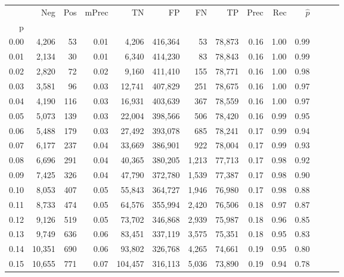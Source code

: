 \begin{tabular}{rrrrrrrrrrrrrr}
\toprule
{} &     Neg &    Pos & mPrec &       TN &       FP &      FN &      TP &  Prec &   Rec & $\hat{p}$ \\
p    &         &        &       &          &          &         &         &       &       &           \\
\midrule
0.00 &   4,206 &     53 &  0.01 &    4,206 &  416,364 &      53 &  78,873 &  0.16 &  1.00 &      0.99 \\
0.01 &   2,134 &     30 &  0.01 &    6,340 &  414,230 &      83 &  78,843 &  0.16 &  1.00 &      0.99 \\
0.02 &   2,820 &     72 &  0.02 &    9,160 &  411,410 &     155 &  78,771 &  0.16 &  1.00 &      0.98 \\
0.03 &   3,581 &     96 &  0.03 &   12,741 &  407,829 &     251 &  78,675 &  0.16 &  1.00 &      0.97 \\
0.04 &   4,190 &    116 &  0.03 &   16,931 &  403,639 &     367 &  78,559 &  0.16 &  1.00 &      0.97 \\
0.05 &   5,073 &    139 &  0.03 &   22,004 &  398,566 &     506 &  78,420 &  0.16 &  0.99 &      0.95 \\
0.06 &   5,488 &    179 &  0.03 &   27,492 &  393,078 &     685 &  78,241 &  0.17 &  0.99 &      0.94 \\
0.07 &   6,177 &    237 &  0.04 &   33,669 &  386,901 &     922 &  78,004 &  0.17 &  0.99 &      0.93 \\
0.08 &   6,696 &    291 &  0.04 &   40,365 &  380,205 &   1,213 &  77,713 &  0.17 &  0.98 &      0.92 \\
0.09 &   7,425 &    326 &  0.04 &   47,790 &  372,780 &   1,539 &  77,387 &  0.17 &  0.98 &      0.90 \\
0.10 &   8,053 &    407 &  0.05 &   55,843 &  364,727 &   1,946 &  76,980 &  0.17 &  0.98 &      0.88 \\
0.11 &   8,733 &    474 &  0.05 &   64,576 &  355,994 &   2,420 &  76,506 &  0.18 &  0.97 &      0.87 \\
0.12 &   9,126 &    519 &  0.05 &   73,702 &  346,868 &   2,939 &  75,987 &  0.18 &  0.96 &      0.85 \\
0.13 &   9,749 &    636 &  0.06 &   83,451 &  337,119 &   3,575 &  75,351 &  0.18 &  0.95 &      0.83 \\
0.14 &  10,351 &    690 &  0.06 &   93,802 &  326,768 &   4,265 &  74,661 &  0.19 &  0.95 &      0.80 \\
0.15 &  10,655 &    771 &  0.07 &  104,457 &  316,113 &   5,036 &  73,890 &  0.19 &  0.94 &      0.78 \\

\end{tabular}
